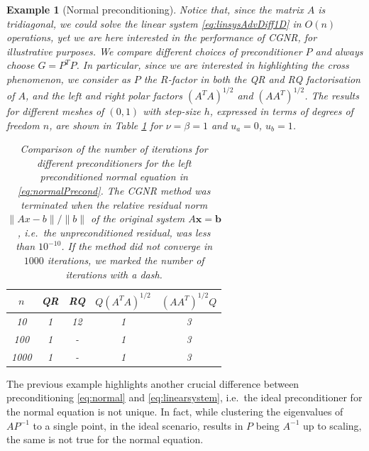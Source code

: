 \documentclass[hidelinks,onefignum,onetabnum]{siamart220329}
\newcommand{\bb}[1]{#1}
\newtheorem{example}{Example}
\let\vec\mathbf
\begin{document}
\begin{example}[{Normal preconditioning}]
    Notice that, since the matrix $A$ is tridiagonal, we could solve the linear system \eqref{eq:linsysAdvDiff1D} in $O(n)$ operations, yet we are here interested in the performance of CGNR, for illustrative purposes.
    \bb{We compare} different choices of preconditioner $P$ and always choose $G=P^TP$.
    In particular, since we are interested in highlighting the cross phenomenon, we consider as $P$ the $R$-factor in both the QR and RQ factorisation of $A$, and the left and right polar factors $(A^TA)^{1/2}$ and $(AA^T)^{1/2}$.
    The results for different meshes of $(0,1)$ with step-size $h$, expressed in terms of degrees of freedom $n$, are shown in Table \ref{tab:cross-eyed} for $\nu=\beta=1$ and $u_a=0$, $u_b=1$.
\begin{table}
        \centering
        \caption{Comparison of the number of iterations for different preconditioners for the left preconditioned normal equation in \eqref{eq:normalPrecond}.
            The CGNR method was terminated when the \bb{relative residual norm $\lVert Ax - b \rVert / \lVert b \rVert$ of the original system $A\vec{x}=\vec{b}$, i.e.~the unpreconditioned residual,} was less than $10^{-10}$.
            If the method did not converge in $1000$ iterations, we marked the number of iterations with a dash.
        }
        {
            \label{tab:cross-eyed}
            \begin{tabular}{c|c|c|c|c}
                \toprule
                $n$  & QR & RQ & $Q(A^TA)^{1/2}$ & $(AA^T)^{1/2}Q$ \\
                \midrule
                10   & 1  & 12 & 1               & 3               \\
                100  & 1  & -  & 1               & 3               \\
                1000 & 1  & -  & \bb{1}          & \bb{3}          \\
                \bottomrule
            \end{tabular}
        }
    \end{table}
\end{example}
The previous example highlights another crucial difference between preconditioning \eqref{eq:normal} and \eqref{eq:linearsystem}, i.e.~the ideal preconditioner for the normal equation is not unique.
In fact, while clustering the eigenvalues of $AP^{-1}$ to a single point, in the ideal scenario, results in $P$ being $A^{-1}$ up to scaling, the same is not true for the normal equation.
\end{document}
